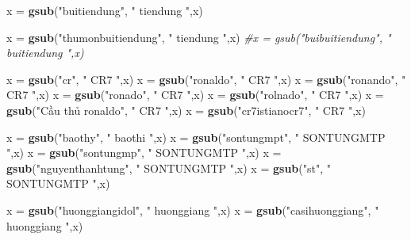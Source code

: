 \documentclass[]{article}
\newenvironment{Shaded}{\begin{snugshade}}{\end{snugshade}}
\newcommand{\CommentTok}[1]{\textcolor[rgb]{0.56,0.35,0.01}{\textit{#1}}}
\newcommand{\KeywordTok}[1]{\textcolor[rgb]{0.13,0.29,0.53}{\textbf{#1}}}
\newcommand{\NormalTok}[1]{#1}
\newcommand{\StringTok}[1]{\textcolor[rgb]{0.31,0.60,0.02}{#1}}
\begin{document}
\begin{Shaded}
\begin{Highlighting}[]
\NormalTok{x =}\StringTok{ }\KeywordTok{gsub}\NormalTok{(}\StringTok{"buitiendung"}\NormalTok{, }\StringTok{" tiendung "}\NormalTok{,x) }

\NormalTok{x =}\StringTok{ }\KeywordTok{gsub}\NormalTok{(}\StringTok{"thumonbuitiendung"}\NormalTok{, }\StringTok{" tiendung "}\NormalTok{,x) }
\CommentTok{#x = gsub("buibuitiendung", " buitiendung ",x)}

\NormalTok{x =}\StringTok{ }\KeywordTok{gsub}\NormalTok{(}\StringTok{"cr"}\NormalTok{, }\StringTok{" CR7 "}\NormalTok{,x) }
\NormalTok{x =}\StringTok{ }\KeywordTok{gsub}\NormalTok{(}\StringTok{"ronaldo"}\NormalTok{, }\StringTok{" CR7 "}\NormalTok{,x) }
\NormalTok{x =}\StringTok{ }\KeywordTok{gsub}\NormalTok{(}\StringTok{"ronando"}\NormalTok{, }\StringTok{" CR7 "}\NormalTok{,x) }
\NormalTok{x =}\StringTok{ }\KeywordTok{gsub}\NormalTok{(}\StringTok{"ronado"}\NormalTok{, }\StringTok{" CR7 "}\NormalTok{,x)  }
\NormalTok{x =}\StringTok{ }\KeywordTok{gsub}\NormalTok{(}\StringTok{"rolnado"}\NormalTok{, }\StringTok{" CR7 "}\NormalTok{,x)}
\NormalTok{x =}\StringTok{ }\KeywordTok{gsub}\NormalTok{(}\StringTok{"Cầu thủ ronaldo"}\NormalTok{, }\StringTok{" CR7 "}\NormalTok{,x)}
\NormalTok{x =}\StringTok{ }\KeywordTok{gsub}\NormalTok{(}\StringTok{"cr7istianocr7"}\NormalTok{, }\StringTok{" CR7 "}\NormalTok{,x)}


\NormalTok{x =}\StringTok{ }\KeywordTok{gsub}\NormalTok{(}\StringTok{"baothy"}\NormalTok{, }\StringTok{" baothi "}\NormalTok{,x) }
\NormalTok{x =}\StringTok{ }\KeywordTok{gsub}\NormalTok{(}\StringTok{"sontungmpt"}\NormalTok{, }\StringTok{" SONTUNGMTP "}\NormalTok{,x)}
\NormalTok{x =}\StringTok{ }\KeywordTok{gsub}\NormalTok{(}\StringTok{"sontungmp"}\NormalTok{, }\StringTok{" SONTUNGMTP "}\NormalTok{,x) }
\NormalTok{x =}\StringTok{ }\KeywordTok{gsub}\NormalTok{(}\StringTok{"nguyenthanhtung"}\NormalTok{, }\StringTok{" SONTUNGMTP "}\NormalTok{,x) }
\NormalTok{x =}\StringTok{ }\KeywordTok{gsub}\NormalTok{(}\StringTok{"st"}\NormalTok{, }\StringTok{" SONTUNGMTP "}\NormalTok{,x) }

\NormalTok{x =}\StringTok{ }\KeywordTok{gsub}\NormalTok{(}\StringTok{"huonggiangidol"}\NormalTok{, }\StringTok{" huonggiang "}\NormalTok{,x) }
\NormalTok{x =}\StringTok{ }\KeywordTok{gsub}\NormalTok{(}\StringTok{"casihuonggiang"}\NormalTok{, }\StringTok{" huonggiang "}\NormalTok{,x) }
\end{Highlighting}
\end{Shaded}
\end{document}

